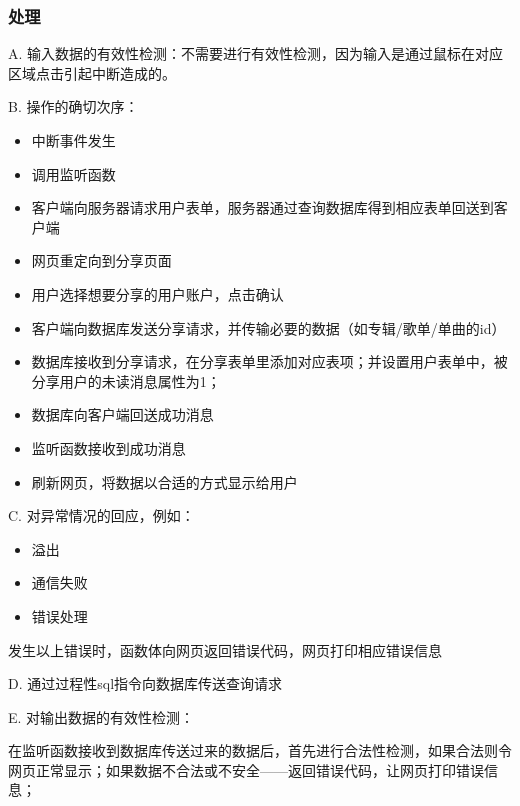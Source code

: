    
   \subsubsection{处理}
   
   
   
   A. 输入数据的有效性检测：不需要进行有效性检测，因为输入是通过鼠标在对应区域点击引起中断造成的。
   
   B. 操作的确切次序：
   \begin{adjustwidth}{2cm}{1cm}\qquad
	   \begin{itemize}
		   \item 中断事件发生
		   \item 调用监听函数
		   \item 客户端向服务器请求用户表单，服务器通过查询数据库得到相应表单回送到客户端
		   \item 网页重定向到分享页面
		   \item 用户选择想要分享的用户账户，点击确认
		   \item 客户端向数据库发送分享请求，并传输必要的数据（如专辑/歌单/单曲的id）
		   \item 数据库接收到分享请求，在分享表单里添加对应表项；并设置用户表单中，被分享用户的未读消息属性为1；
		   \item 数据库向客户端回送成功消息
		   \item 监听函数接收到成功消息
		   \item 刷新网页，将数据以合适的方式显示给用户
	   \end{itemize}		
   \end{adjustwidth}
	
   
   C. 对异常情况的回应，例如：
   \begin{adjustwidth}{2cm}{1cm}\qquad
	   \begin{itemize}
		   \item 溢出
		   \item 通信失败
		   \item 错误处理
	   \end{itemize}		
   \end{adjustwidth}
   
	   发生以上错误时，函数体向网页返回错误代码，网页打印相应错误信息
   
D. 通过过程性sql指令向数据库传送查询请求
		   
   E. 对输出数据的有效性检测：
   
   在监听函数接收到数据库传送过来的数据后，首先进行合法性检测，如果合法则令网页正常显示；如果数据不合法或不安全——返回错误代码，让网页打印错误信息；
   
